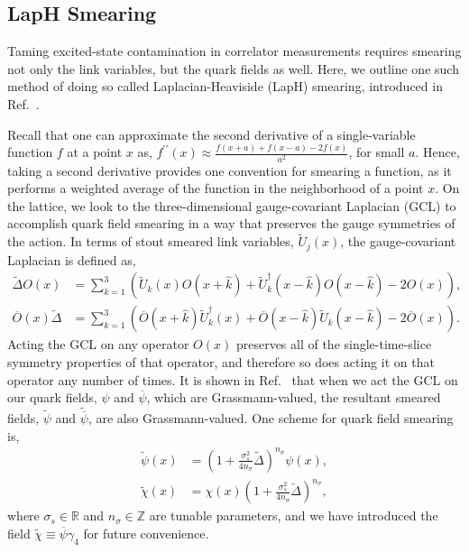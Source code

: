     \subsection{LapH Smearing}
    Taming excited-state contamination in correlator measurements requires smearing not only the link variables, but the quark fields as well. Here, we outline one such method of doing so called Laplacian-Heaviside (LapH) smearing, introduced in Ref.~\cite{Morningstar:2011ka}.
    
    Recall that one can approximate the second derivative of a single-variable function $f$ at a point $x$ as, $f^{\prime\prime}(x) \approx \frac{f(x+a) + f(x-a) - 2f(x)}{a^2}$, for small $a$. Hence, taking a second derivative provides one convention for smearing a function, as it performs a weighted average of the function in the neighborhood of a point $x$. On the lattice, we look to the three-dimensional gauge-covariant Laplacian (GCL) to accomplish quark field smearing in a way that preserves the gauge symmetries of the action. In terms of stout smeared link variables, $\widetilde U_j(x)$, the gauge-covariant Laplacian is defined as,
    \begin{equation}\label{eq:quark_smearing}
    \begin{aligned} \widetilde{\Delta} O(x) &=\sum_{k=1}^{3}\left(\widetilde{U}_{k}(x) O(x+\hat{k})+\widetilde{U}_{k}^{\dagger}(x-\hat{k}) O(x-\hat{k})-2 O(x)\right), \\ \overline{O}(x) \overleftarrow{\Delta} &=\sum_{k=1}^{3}\left(\overline{O}(x+\hat{k}) \widetilde{U}_{k}^{\dagger}(x)+\overline{O}(x-\hat{k}) \widetilde{U}_{k}(x-\hat{k})-2 \overline{O}(x)\right). \end{aligned}
    \end{equation}
    Acting the GCL on any operator $O(x)$ preserves all of the single-time-slice symmetry properties of that operator, and therefore so does acting it on that operator any number of times. It is shown in Ref.~\cite{spectroscopy} that when we act the GCL on our quark fields, $\psi$ and $\overline\psi$, which are Grassmann-valued, the resultant smeared fields, $\widetilde{\psi}$ and $\widetilde{\overline\psi}$, are also Grassmann-valued. One scheme for quark field smearing is,
    \begin{equation}\label{eq:gauss_smear}
    \begin{aligned} \widetilde{\psi}(x) &=\left(1+\frac{\sigma_{s}^{2}}{4 n_{\sigma}} \widetilde{\Delta}\right)^{n_{\sigma}} \psi(x), \\ \widetilde{\chi}(x) &=\chi(x)\left(1+\frac{\sigma_{s}^{2}}{4 n_{\sigma}} \overleftarrow{\Delta}\right)^{n_{\sigma}}, \end{aligned}
    \end{equation}
    where $\sigma_s\in\mathbb{R}$ and $n_\sigma\in\mathbb{Z}$ are tunable parameters, and we have introduced the field $\widetilde{\chi} \equiv \overline \psi \gamma_4$ for future convenience.

